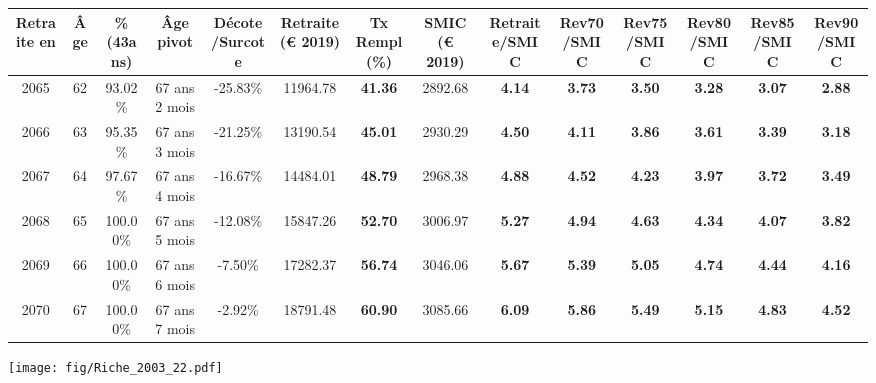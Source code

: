 \begin{adjustbox}{max width=\textwidth} 
\begin{tabular}[htb]{|c|c||c|c|c||c|c||c||c|c|c|c|c|c|} 
\hline 
 Retraite en &  Âge &  \%(43ans) &  Âge pivot &  Décote/Surcote &  Retraite (\euro{} 2019) &  Tx Rempl(\%) &  SMIC (\euro{} 2019) &  Retraite/SMIC &  Rev70/SMIC &  Rev75/SMIC &  Rev80/SMIC &  Rev85/SMIC &  Rev90/SMIC \\ 
\hline \hline 
 2065 &  62 &  93.02\% &  67 ans 2 mois &  -25.83\% &  11964.78 &  {\bf 41.36} &  2892.68 &  {\bf 4.14} &  {\bf 3.73} &  {\bf 3.50} &  {\bf 3.28} &  {\bf 3.07} &  {\bf 2.88} \\ 
\hline 
 2066 &  63 &  95.35\% &  67 ans 3 mois &  -21.25\% &  13190.54 &  {\bf 45.01} &  2930.29 &  {\bf 4.50} &  {\bf 4.11} &  {\bf 3.86} &  {\bf 3.61} &  {\bf 3.39} &  {\bf 3.18} \\ 
\hline 
 2067 &  64 &  97.67\% &  67 ans 4 mois &  -16.67\% &  14484.01 &  {\bf 48.79} &  2968.38 &  {\bf 4.88} &  {\bf 4.52} &  {\bf 4.23} &  {\bf 3.97} &  {\bf 3.72} &  {\bf 3.49} \\ 
\hline 
 2068 &  65 &  100.00\% &  67 ans 5 mois &  -12.08\% &  15847.26 &  {\bf 52.70} &  3006.97 &  {\bf 5.27} &  {\bf 4.94} &  {\bf 4.63} &  {\bf 4.34} &  {\bf 4.07} &  {\bf 3.82} \\ 
\hline 
 2069 &  66 &  100.00\% &  67 ans 6 mois &  -7.50\% &  17282.37 &  {\bf 56.74} &  3046.06 &  {\bf 5.67} &  {\bf 5.39} &  {\bf 5.05} &  {\bf 4.74} &  {\bf 4.44} &  {\bf 4.16} \\ 
\hline 
 2070 &  67 &  100.00\% &  67 ans 7 mois &  -2.92\% &  18791.48 &  {\bf 60.90} &  3085.66 &  {\bf 6.09} &  {\bf 5.86} &  {\bf 5.49} &  {\bf 5.15} &  {\bf 4.83} &  {\bf 4.52} \\ 
\hline 
\hline 
\end{tabular} 
\end{adjustbox} 
 
 \vspace{0.1cm} 

 \begin{center}\texttt{[image: fig/Riche\_2003\_22.pdf]}\end{center} \label{fig/Riche_2003_22.pdf} 

\newpage 
 
